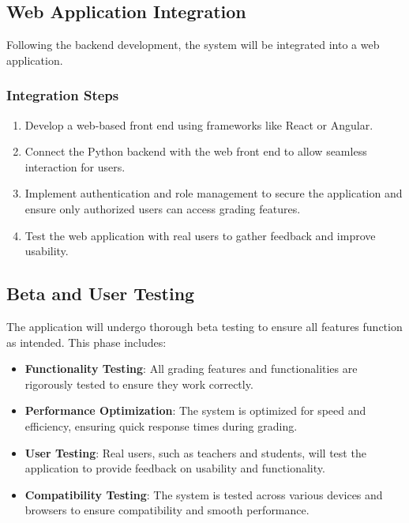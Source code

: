 \documentclass[ms,twoside,print]{nuthesis}
\begin{document}
\subsection{Web Application Integration}
Following the backend development, the system will be integrated into a web application.

\subsubsection{Integration Steps}
\begin{enumerate}
    \item Develop a web-based front end using frameworks like React or Angular.
    \item Connect the Python backend with the web front end to allow seamless interaction for users.
    \item Implement authentication and role management to secure the application and ensure only authorized users can access grading features.
    \item Test the web application with real users to gather feedback and improve usability.
\end{enumerate}

\subsection{Beta and User Testing}
The application will undergo thorough beta testing to ensure all features function as intended. This phase includes:
\begin{itemize}
    \item \textbf{Functionality Testing}: All grading features and functionalities are rigorously tested to ensure they work correctly.
    \item \textbf{Performance Optimization}: The system is optimized for speed and efficiency, ensuring quick response times during grading.
    \item \textbf{User Testing}: Real users, such as teachers and students, will test the application to provide feedback on usability and functionality.
    \item \textbf{Compatibility Testing}: The system is tested across various devices and browsers to ensure compatibility and smooth performance.
\end{itemize}
\end{document}
